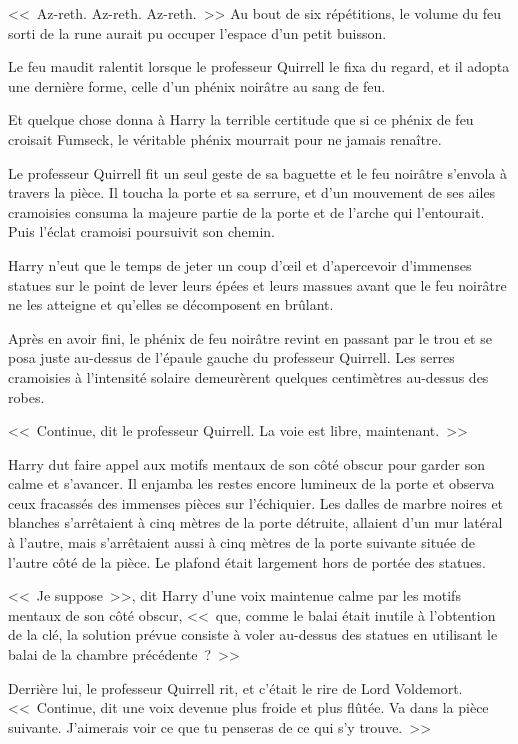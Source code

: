 <<~Az-reth. Az-reth. Az-reth.~>> Au bout de six répétitions, le volume du feu sorti de la rune aurait pu occuper l'espace d'un petit buisson.

Le feu maudit ralentit lorsque le professeur Quirrell le fixa du regard, et il adopta une dernière forme, celle d'un phénix noirâtre au sang de feu.

Et quelque chose donna à Harry la terrible certitude que si ce phénix de feu croisait Fumseck, le véritable phénix mourrait pour ne jamais renaître.

Le professeur Quirrell fit un seul geste de sa baguette et le feu noirâtre s'envola à travers la pièce. Il toucha la porte et sa serrure, et d'un mouvement de ses ailes cramoisies consuma la majeure partie de la porte et de l'arche qui l'entourait. Puis l'éclat cramoisi poursuivit son chemin.

Harry n'eut que le temps de jeter un coup d'œil et d'apercevoir d'immenses statues sur le point de lever leurs épées et leurs massues avant que le feu noirâtre ne les atteigne et qu'elles se décomposent en brûlant.

Après en avoir fini, le phénix de feu noirâtre revint en passant par le trou et se posa juste au-dessus de l'épaule gauche du professeur Quirrell. Les serres cramoisies à l'intensité solaire demeurèrent quelques centimètres au-dessus des robes.

<<~Continue, dit le professeur Quirrell. La voie est libre, maintenant.~>>

Harry dut faire appel aux motifs mentaux de son côté obscur pour garder son calme et s'avancer. Il enjamba les restes encore lumineux de la porte et observa ceux fracassés des immenses pièces sur l'échiquier. Les dalles de marbre noires et blanches s'arrêtaient à cinq mètres de la porte détruite, allaient d'un mur latéral à l'autre, mais s'arrêtaient aussi à cinq mètres de la porte suivante située de l'autre côté de la pièce. Le plafond était largement hors de portée des statues.

<<~Je suppose~>>, dit Harry d'une voix maintenue calme par les motifs mentaux de son côté obscur, <<~que, comme le balai était inutile à l'obtention de la clé, la solution prévue consiste à voler au-dessus des statues en utilisant le balai de la chambre précédente~?~>>

Derrière lui, le professeur Quirrell rit, et c'était le rire de Lord Voldemort. <<~Continue, dit une voix devenue plus froide et plus flûtée. Va dans la pièce suivante. J'aimerais voir ce que tu penseras de ce qui s'y trouve.~>>


